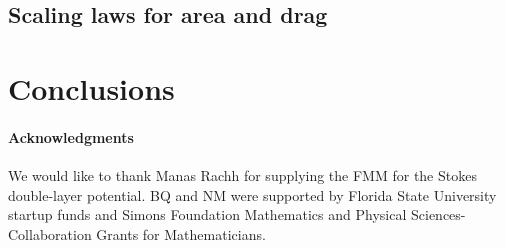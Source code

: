 \documentclass[preprint, 10pt]{elsarticle}
\begin{document}
\subsection{Scaling laws for area and drag}
\label{sec:scaling}


\section{Conclusions\label{s:conclusions}}


\paragraph{\bf Acknowledgments} We would like to thank Manas Rachh for
supplying the FMM for the Stokes double-layer potential. BQ and NM were
supported by Florida State University startup funds and Simons
Foundation Mathematics and Physical Sciences-Collaboration Grants for
Mathematicians.

 

\end{document}
